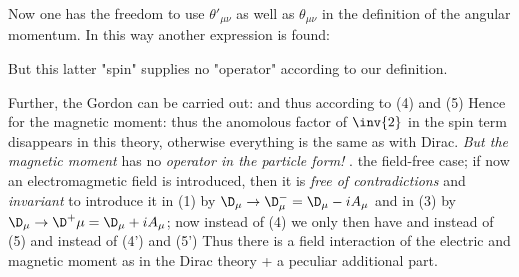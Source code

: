 Now one has the freedom to use $\theta'_{\mu\nu}$ as well as $\theta_{\mu\nu}$ in the definition of the angular momentum. In this way another expression is found:

But this latter "spin" supplies no "operator" according to our definition.

Further, the Gordon  can be carried out:
and thus according to (4) and (5)
Hence for the magnetic moment:
thus the anomolous factor of $\inv{2}$ in the spin term disappears in this theory, otherwise everything is the same as with Dirac. \textit{But the magnetic moment} has no \textit{operator in the particle form!} .  the field-free case; if now an electromagmetic field is introduced, then it is \textit{free of contradictions} and \textit{invariant} to introduce it in (1) by $\D_\mu \to \D_\mu^- = \D_\mu - iA_\mu$ and in (3) by $\D_\mu \to \D^+\mu = \D_\mu + iA_\mu$; now instead of (4) we only then have
and instead of (5)
and instead of (4') and (5')
Thus there is a field interaction of the electric and magnetic moment as in the Dirac theory + a peculiar additional part.

